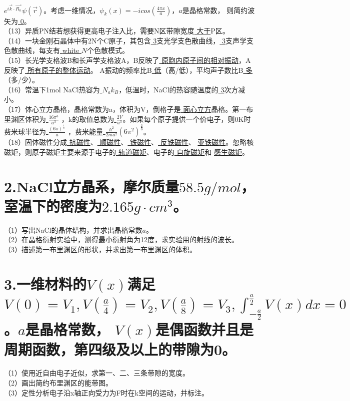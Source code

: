 \documentclass[UTF8]{ctexart}
\begin{document}
\uline{\color{white} $e^{i\vec{k}\cdot\vec{R_n}}$}$\psi(\vec{r})$。考虑一维情况，$\psi_k(x)=-icos(\frac{4\pi x}{a})$，$a$是晶格常数，
则简约波矢为\uline{\color{white} 0}。\\
（13）异质PN结若想获得更高电子注入比，需要N区带隙宽度\uline{\color{white} 大于}P区。\\
（14）一块金刚石晶体中有2N个C原子，其包含\uline{\color{white} 3}支光学支色散曲线，\uline{\color{white} 3}支声学支色散曲线，每支有\uline{\color
{white} $N$}个色散模式。\\
（15）长光学支格波B和长声学支格波A，B反映了\uline{\color{white} 原胞内原子间的相对振动}，A反映了\uline{\color{white} 所有原子的整体运动}。
A振动的频率比B\uline{\color{white} 低}（高/低），平均声子数比B\uline{\color{white} 多}（多/少）。\\
（16）常温下1mol NaCl热容为\uline{\color{white} $N_ak_B$}，低温时，NaCl的热容随温度的\uline{\color{white} 3}次方减小。\\
（17）体心立方晶格，晶格常数为a，体积为V，倒格子是\uline{\color{white} 面心立方}晶格。第一布里渊区体积为\uline{\color{white} $\frac{16\pi^3}{a^3}$}
，k的取值总数为\uline{\color{white} $\frac{2V}{a^3}$}。如果每个原子提供一个价电子，则0K时费米球半径为\uline{\color{white} $\frac{(6\pi)^{\frac{1}{3}}}{a}$}
，费米能量\uline{\color{white} $\frac{\hbar^2}{2ma^2}(6\pi^2)^{\frac{2}{3}}$}。\\
（18）固体磁性分成\uline{\color{white} 抗磁性}、\uline{\color{white} 顺磁性}、\uline{\color{white} 铁磁性}、\uline{\color{white} 反铁磁性}、
\uline{\color{white} 亚铁磁性}。忽略核磁矩，则原子磁矩主要来源于电子的\uline{\color{white} 轨道磁矩}、电子的\uline{\color{white} 自旋磁矩}和
\uline{\color{white} 感生磁矩}。\\
\section*{2.NaCl立方晶系，摩尔质量$58.5g/mol$，室温下的密度为$2.165g\cdot cm^3$。}
（1）写出NaCl的晶体结构，并求出晶格常数$a$。\\
（2）在晶格衍射实验中，测得最小衍射角为12度，求实验用的射线的波长。\\
（3）描述第一布里渊区的形状，并求出第一布里渊区的体积。\\
\section*{3.一维材料的$V(x)$满足$V(0)=V_1,V(\frac{a}{4})=V_2,V(\frac{a}{8})=V_3,\int_{-\frac{a}{2}}^{\frac{a}{2}}V(x)dx=0$。$a$是晶格常数，
$V(x)$是偶函数并且是周期函数，第四级及以上的带隙为0。}
（1）使用近自由电子近似，求第一、二、三条带隙的宽度。\\
（2）画出简约布里渊区的能带图。\\
（3）定性分析电子沿x轴正向受力为F时在k空间的运动，并标注。\\
\end{document}
